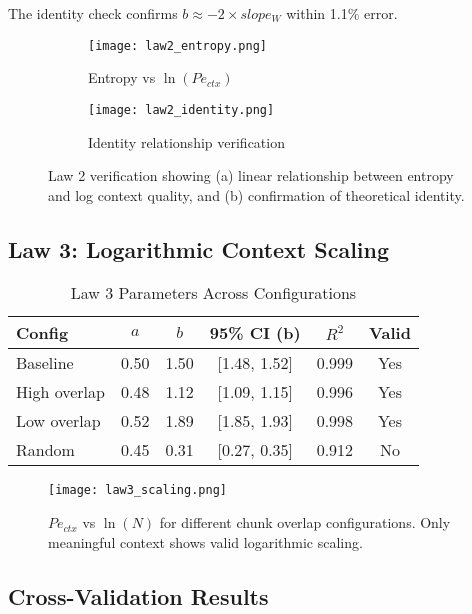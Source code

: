 \documentclass[conference]{IEEEtran}
\begin{document}
The identity check confirms $b \approx -2 \times slope_W$ within 1.1\% error.

\begin{figure}[h]
\centering
\begin{subfigure}{0.45\textwidth}
\texttt{[image: law2\_entropy.png]}
\caption{Entropy vs $\ln(Pe_{ctx})$}
\end{subfigure}
\begin{subfigure}{0.45\textwidth}
\texttt{[image: law2\_identity.png]}
\caption{Identity relationship verification}
\end{subfigure}
\caption{Law 2 verification showing (a) linear relationship between entropy and log context quality, and (b) confirmation of theoretical identity.}
\label{fig:law2}
\end{figure}

\subsection{Law 3: Logarithmic Context Scaling}

\begin{table}[h]
\centering
\caption{Law 3 Parameters Across Configurations}
\label{tab:law3_results}
\begin{tabular}{@{}lccccc@{}}
\toprule
Config & $a$ & $b$ & 95\% CI (b) & $R^2$ & Valid \\
\midrule
Baseline & 0.50 & 1.50 & [1.48, 1.52] & 0.999 & Yes \\
High overlap & 0.48 & 1.12 & [1.09, 1.15] & 0.996 & Yes \\
Low overlap & 0.52 & 1.89 & [1.85, 1.93] & 0.998 & Yes \\
Random & 0.45 & 0.31 & [0.27, 0.35] & 0.912 & No \\
\bottomrule
\end{tabular}
\end{table}

\begin{figure}[h]
\centering
\texttt{[image: law3\_scaling.png]}
\caption{$Pe_{ctx}$ vs $\ln(N)$ for different chunk overlap configurations. Only meaningful context shows valid logarithmic scaling.}
\label{fig:law3}
\end{figure}

\subsection{Cross-Validation Results}
\end{document}
